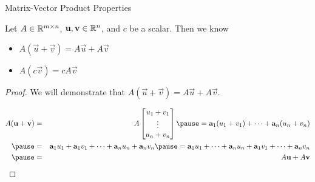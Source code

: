 \documentclass[xcoler=dvipsnames, aspectratio=169]{beamer}
\begin{document}
        \begin{frame}{Matrix-Vector Product Properties}
            \scriptsize
            \begin{tcolorbox}
                Let $A\in\mathbb{R}^{m\times n}$, $\mathbf{u},\mathbf{v}\in\mathbb{R}^n$, and $c$ be a scalar. Then we know
                \begin{itemize}
                    \item $A(\vec{u}+\vec{v}) = A\vec{u} + A\vec{v}$
                    \item $A(c\vec{v}) = cA\vec{v}$
                \end{itemize}
            \end{tcolorbox}
                \vfill
                \pause
                \begin{proof}
                    We will demonstrate that $A(\vec{u}+\vec{v}) = A\vec{u} + A\vec{v}$.

                    \begin{eqnarray*}
                        A(\vec{u}+\vec{v}) &=& A\begin{bmatrix}
                            u_1+v_1\\
                            \vdots\\
                            u_n+v_n
                        \end{bmatrix} \pause = \vec{a}_1(u_1+v_1) + \cdots + \vec{a}_n(u_n+v_n) \\
                        \pause &=& \vec{a}_1u_1 + \vec{a}_1v_1 + \cdots + \vec{a}_nu_n + \vec{a}_nv_n\pause = \vec{a}_1u_1 + \cdots + \vec{a}_nu_n + \vec{a}_1v_1 + \cdots + \vec{a}_nv_n \\
                        \pause &=& A\vec{u} + A\vec{v}
                    \end{eqnarray*}
                \end{proof}
        \end{frame}
\end{document}

